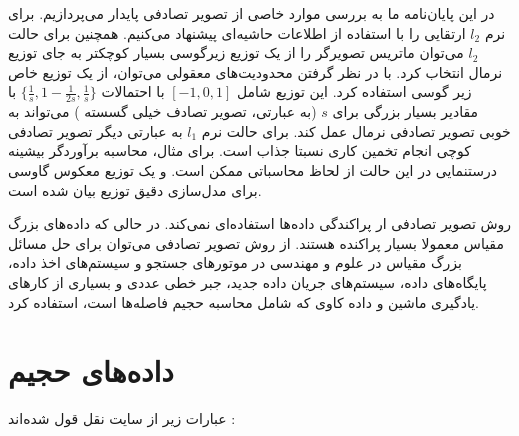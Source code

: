 در این پایان‌نامه ما به بررسی موارد خاصی از تصویر تصادفی پایدار می‌پردازیم. برای نرم 
$l_2$
ارتقایی را با استفاده از اطلاعات حاشیه‌ای پیشنهاد می‌کنیم. همچنین برای حالت $l_2$ می‌توان ماتریس تصویرگر را از یک توزیع زیرگوسی
بسیار کوچکتر به جای توزیع نرمال انتخاب کرد. با در نظر گرفتن محدودیت‌های معقولی می‌توان، از یک توزیع خاص زیر گوسی استفاده کرد. این توزیع شامل 
$[-1,0,1]$
با احتمالات 
$\{ \frac{1}{s}, 1-\frac{1}{2s}, \frac{1}{s} \}$
با مقادیر بسیار بزرگی برای 
‌‌‌$s$
(به عبارتی، تصویر تصادف خیلی گسسته 
) می‌تواند به خوبی تصویر تصادفی نرمال عمل کند. برای حالت نرم 
$l_1$
به عبارتی دیگر تصویر تصادفی کوچی 
انجام تخمین کاری نسبتا جذاب است. برای مثال، محاسبه برآوردگر بیشینه درستنمایی 
در این حالت از لحاظ محاسباتی ممکن است. و یک توزیع معکوس گاوسی 
برای مدل‌سازی دقیق توزیع 
بیان شده است.

روش تصویر تصادفی ار پراکندگی داده‌ها استفاده‌ای نمی‌کند. در حالی که داده‌های بزرگ مقیاس معمولا بسیار پراکنده هستند. از روش تصویر تصادفی می‌توان برای حل مسائل بزرگ مقیاس در علوم و مهندسی در موتورهای جستجو و سیستم‌های اخذ داده، پایگاه‌های داده، سیستم‌های جریان داده جدید، جبر خطی عددی و بسیاری از کارهای یادگیری ماشین و داده کاوی که شامل محاسبه حجیم فاصله‌ها است، استفاده کرد.




\section{داده‌های حجیم}
عبارات زیر از سایت 
نقل قول شده‌اند
:

